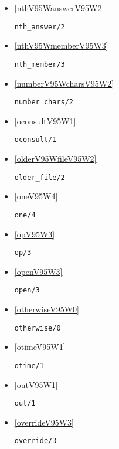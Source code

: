 \begin{itemize}
\item \ref{nthV95WanswerV95W2} 
\begin{verbatim}
nth_answer/2
\end{verbatim}

\item \ref{nthV95WmemberV95W3} 
\begin{verbatim}
nth_member/3
\end{verbatim}

\item \ref{numberV95WcharsV95W2} 
\begin{verbatim}
number_chars/2
\end{verbatim}

\item \ref{oconsultV95W1} 
\begin{verbatim}
oconsult/1
\end{verbatim}

\item \ref{olderV95WfileV95W2} 
\begin{verbatim}
older_file/2
\end{verbatim}

\item \ref{oneV95W4} 
\begin{verbatim}
one/4
\end{verbatim}

\item \ref{opV95W3} 
\begin{verbatim}
op/3
\end{verbatim}

\item \ref{openV95W3} 
\begin{verbatim}
open/3
\end{verbatim}

\item \ref{otherwiseV95W0} 
\begin{verbatim}
otherwise/0
\end{verbatim}

\item \ref{otimeV95W1} 
\begin{verbatim}
otime/1
\end{verbatim}

\item \ref{outV95W1} 
\begin{verbatim}
out/1
\end{verbatim}

\item \ref{overrideV95W3} 
\begin{verbatim}
override/3
\end{verbatim}


\end{itemize}

